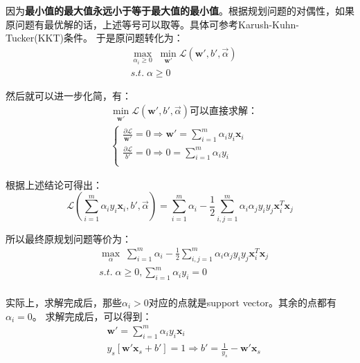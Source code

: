 \documentclass{article}
\begin{document}
因为\textbf{最小值的最大值永远小于等于最大值的最小值}。根据规划问题的对偶性，如果原问题有最优解的话，上述等号可以取等。具体可参考Karush-Kuhn-Tucker(KKT)条件。
于是原问题转化为：
\begin{equation}
	\begin{aligned}
		& \mathop{max}\limits_{\alpha_i\geq 0}\;\mathop{min}\limits_{\textbf{w}'}\mathcal{L}(\textbf{w}',b',\overrightarrow{\alpha})\\
		& s.t.\;\alpha\geq 0
	\end{aligned}
\end{equation}

然后就可以进一步化简，有：
\begin{equation}
	\begin{aligned}
		& \mathop{min}\limits_{\textbf{w}'}\mathcal{L}(\textbf{w}',b',\overrightarrow{\alpha})\mbox{可以直接求解：}\\
		& \begin{cases}
			\frac{\partial\mathcal{L}}{\textbf{w}'}=0\Rightarrow \textbf{w}'=\sum_{i=1}^m\alpha_iy_i\textbf{x}_i\\
			\frac{\partial\mathcal{L}}{b'}=0\Rightarrow 0=\sum_{i=1}^m\alpha_iy_i\\
		\end{cases}
	\end{aligned}	
\end{equation}

根据上述结论可得出：
\begin{equation}
	\mathcal{L}(\sum_{i=1}^m\alpha_iy_i\textbf{x}_i, b', \overrightarrow{\alpha})=\sum_{i=1}^m\alpha_i-\frac{1}{2}\sum_{i,j=1}^m\alpha_i\alpha_jy_iy_j\textbf{x}_i^T\textbf{x}_j
\end{equation}

所以最终原规划问题等价为：
\begin{equation}
	\begin{aligned}
		& \mathop{max}\limits_{\alpha}\;\sum_{i=1}^m\alpha_i-\frac{1}{2}\sum_{i,j=1}^m\alpha_i\alpha_jy_iy_j\textbf{x}_i^T\textbf{x}_j\\
		& s.t.\;\alpha\geq 0,\sum_{i=1}^m\alpha_iy_i=0\\
	\end{aligned}
\end{equation}

实际上，求解完成后，那些$\alpha_i>0$对应的点就是support vector。其余的点都有$\alpha_i=0$。
求解完成后，可以得到：
\begin{equation}
	\begin{aligned}
		& \textbf{w}'=\sum_{i=1}^m\alpha_iy_i\textbf{x}_i\\
		& y_s[\textbf{w}'\textbf{x}_s+b']=1\Rightarrow b'=\frac{1}{y_s}-\textbf{w}'\textbf{x}_s\\
	\end{aligned}
\end{equation}
\end{document}
